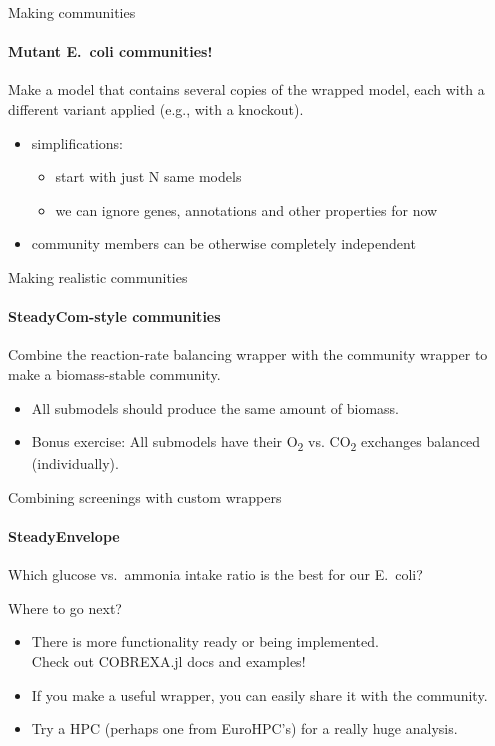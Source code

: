 \documentclass[aspectratio=169]{beamer}
\begin{document}
\begin{frame}{Making communities}
\framesubtitle{Mutant E.~coli communities!}

Make a model that contains several copies of the wrapped model, each with a different variant applied (e.g., with a knockout).

\begin{itemize}
\item simplifications:
  \begin{itemize}
  \item start with just N same models
  \item we can ignore genes, annotations and other properties for now
  \end{itemize}
\item community members can be otherwise completely independent
\end{itemize}
\end{frame}

\begin{frame}{Making realistic communities}
\framesubtitle{SteadyCom-style communities}

Combine the reaction-rate balancing wrapper with the community wrapper to make a biomass-stable community.

\begin{itemize}
\item All submodels should produce the same amount of biomass.
\item Bonus exercise: All submodels have their O\textsubscript{2} vs. CO\textsubscript{2} exchanges balanced (individually).
\end{itemize}
\end{frame}

\begin{frame}{Combining screenings with custom wrappers}
\framesubtitle{SteadyEnvelope}
Which glucose vs.~ammonia intake ratio is the best for our E.~coli?
\end{frame}


\begin{frame}{Where to go next?}
\begin{itemize}
\item There is more functionality ready or being implemented. \\Check out COBREXA.jl docs and examples!
\item If you make a useful wrapper, you can easily share it with the community.
\item Try a HPC (perhaps one from EuroHPC's) for a really huge analysis.
\end{itemize}
\end{frame}

\makelastslide{}
\end{document}
